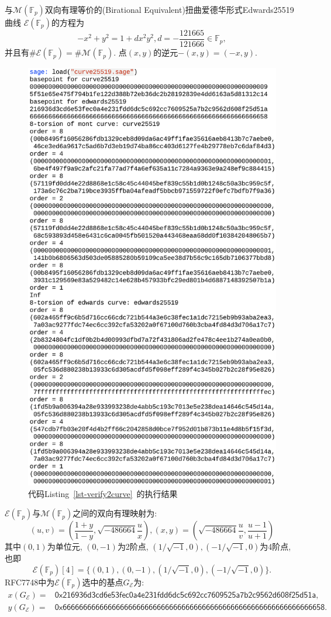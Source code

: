 \documentclass{article}
\newcommand{\F}{\mathbb{F}}
\begin{document}
与$\mathcal{M}(\F_p)$双向有理等价的(Birational Equivalent)扭曲爱德华形式Edwards25519曲线
$\mathcal{E}(\F_p)$的方程为
$$
-x^2 + y^2 = 1 + dx^2y^2, d = -\frac{121665}{121666} \in \F_p, 
$$
并且有$\#\mathcal{E}(\F_p) = \#\mathcal{M}(\F_p)$. 点$(x,y)$的逆元$-(x,y) = (-x,y)$.



\begin{figure}[htbp]
\centering
\includegraphics[width=.85\textwidth]{verify2curve.png}
\caption{代码Listing~\ref{lst-verify2curve}~的执行结果}\label{fig-verify2curve}
\end{figure}

$\mathcal{E}(\F_p)$与$\mathcal{M}(\F_p)$之间的双向有理映射为:
$$
(u, v) =  \left( \frac{1+y}{1-y}, \sqrt{-486664}\frac{u}{x} \right), 
(x, y)  =  \left( \sqrt{-486664}\frac{u}{v}, \frac{u-1}{u+1}\right)
$$
其中$(0,1)$为单位元, $(0,-1)$为2阶点, $ (1/\sqrt{-1}, 0), (-1/\sqrt{-1}, 0)$为4阶点, 也即
$$
\mathcal{E}(\F_p)[4] = \{ (0,1), (0,-1), (1/\sqrt{-1}, 0), (-1/\sqrt{-1}, 0) \}.
$$
RFC7748中为$\mathcal{E}(\F_p)$选中的基点$G_{\mathcal{E}}$为:
$$
\begin{array}{rl}
x(G_{\mathcal{E}}) =  & 
\textsf{0x216936d3cd6e53fec0a4e231fdd6dc5c692cc7609525a7b2c9562d608f25d51a}, \\
y(G_{\mathcal{E}}) = & 
\textsf{0x6666666666666666666666666666666666666666666666666666666666666658}.
\end{array}
$$
\end{document}
